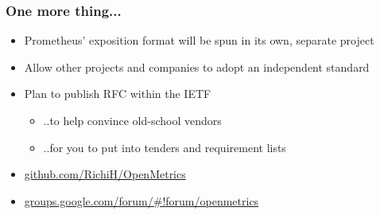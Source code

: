\documentclass[t]{beamer}
\begin{document}
%
\begin{frame}
	\frametitle{One more thing...}
	\begin{itemize}
		\item Prometheus' exposition format will be spun in its own, separate project
		\item Allow other projects and companies to adopt an independent standard
		\item Plan to publish RFC within the IETF
		\begin{itemize}
			\item ..to help convince old-school vendors
			\item ..for you to put into tenders and requirement lists
		\end{itemize}
		\item \url{github.com/RichiH/OpenMetrics}
		\item \url{groups.google.com/forum/\#!forum/openmetrics}
	\end{itemize}
\end{frame}








\end{document}
